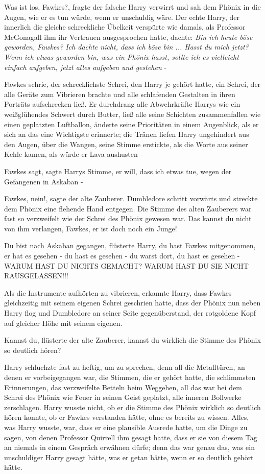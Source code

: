 \glqq{}Was ist los, Fawkes?\grqq{}, fragte der falsche Harry verwirrt und sah dem
Phönix in die Augen, wie er es tun würde, wenn er unschuldig wäre. Der echte
Harry, der innerlich die gleiche schreckliche Übelkeit verspürte wie damals, als
Professor McGonagall ihm ihr Vertrauen ausgesprochen hatte, dachte: \emph{\glqq{}
Bin ich heute böse geworden,} \emph{Fawkes? Ich dachte nicht, dass ich böse
bin ... Hasst du mich jetzt? Wenn ich etwas geworden bin, was ein Phönix hasst,
sollte ich es vielleicht einfach aufgeben, jetzt alles aufgeben und gestehen} -

Fawkes schrie, der schrecklichste Schrei, den Harry je gehört hatte, ein Schrei,
der alle Geräte zum Vibrieren brachte und alle schlafenden Gestalten in ihren
Porträts aufschrecken ließ. Er durchdrang alle Abwehrkräfte Harrys wie ein
weißglühendes Schwert durch Butter, ließ alle seine Schichten zusammenfallen wie
einen geplatzten Luftballon, änderte seine Prioritäten in einem Augenblick, als
er sich an das eine Wichtigste erinnerte; die Tränen liefen Harry ungehindert
aus den Augen, über die Wangen, seine Stimme erstickte, als die Worte aus seiner
Kehle kamen, als würde er Lava aushusten -

\glqq{}Fawkes sagt\grqq{}, sagte Harrys Stimme, \glqq{}er will, dass ich etwas
tue, wegen der Gefangenen in Askaban -\grqq{}

\glqq{}Fawkes, nein!\grqq{}, sagte der alte Zauberer. Dumbledore schritt vorwärts
und streckte dem Phönix eine flehende Hand entgegen. Die Stimme des alten
Zauberers war fast so verzweifelt wie der Schrei des Phönix gewesen war. \glqq{}
Das kannst du nicht von ihm verlangen, Fawkes, er ist doch noch ein
Junge!\grqq{}

\glqq{}Du bist nach Askaban gegangen\grqq{}, flüsterte Harry, \glqq{}du hast
Fawkes mitgenommen, er hat es gesehen - du hast es gesehen - du warst dort, du
hast es gesehen - WARUM HAST DU NICHTS GEMACHT? WARUM HAST DU SIE NICHT
RAUSGELASSEN!!!\grqq{}

Als die Instrumente aufhörten zu vibrieren, erkannte Harry, dass Fawkes
gleichzeitig mit seinem eigenen Schrei geschrien hatte, dass der Phönix nun
neben Harry flog und Dumbledore an seiner Seite gegenüberstand, der rotgoldene
Kopf auf gleicher Höhe mit seinem eigenen.

\glqq{}Kannst du\grqq{}, flüsterte der alte Zauberer, \glqq{}kannst du wirklich
die Stimme des Phönix so deutlich hören?\grqq{}

Harry schluchzte fast zu heftig, um zu sprechen, denn all die Metalltüren, an
denen er vorbeigegangen war, die Stimmen, die er gehört hatte, die schlimmsten
Erinnerungen, das verzweifelte Betteln beim Weggehen, all das war bei dem Schrei
des Phönix wie Feuer in seinen Geist geplatzt, alle inneren Bollwerke
zerschlagen. Harry wusste nicht, ob er die Stimme des Phönix wirklich so
deutlich hören konnte, ob er Fawkes verstanden hätte, ohne es bereits zu wissen.
Alles, was Harry wusste, war, dass er eine plausible Ausrede hatte, um die Dinge
zu sagen, von denen Professor Quirrell ihm gesagt hatte, dass er sie von diesem
Tag an niemals in einem Gespräch erwähnen dürfe; denn das war genau das, was ein
unschuldiger Harry gesagt hätte, was er getan hätte, wenn er so deutlich gehört
hätte.

